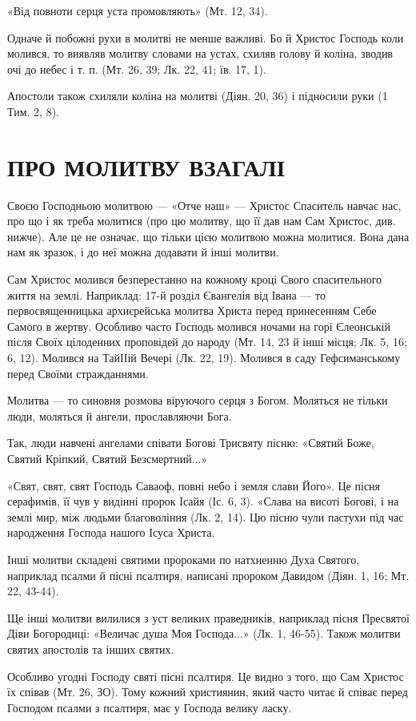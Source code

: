 \documentclass[main.tex]{subfiles}
\begin{document}
«Від повноти серця уста промовляють» (Мт. 12, 34).

Одначе й побожні рухи в молитві не менше важливі. Бо й Христос Господь коли молився, то виявляв молитву словами на устах, схиляв голову й коліна, зводив очі до небес і т. п. (Мт. 26, 39; Лк. 22, 41; їв. 17, 1).

Апостоли також схиляли коліна на молитві (Діян. 20, 36) і підносили руки (1 Тим. 2, 8).

\section{ПРО МОЛИТВУ ВЗАГАЛІ}

Своєю Господньою молитвою — «Отче наш» — Христос Спаситель навчає нас, про що і як треба молитися (про цю молитву, що її дав нам Сам Христос, див. нижче). Але це не означає, що тільки цією молитвою можна молитися. Вона дана нам як зразок, і до неї можна додавати й інші молитви.

Сам Христос молився безперестанно на кожному кроці Свого спасительного життя на землі. Наприклад: 17-й розділ Євангелія від Івана — то первосвященницька архиєрейська молитва Христа перед принесенням Себе Самого в жертву. Особливо часто Господь молився ночами на горі Єлеонській після Своїх цілоденних проповідей до народу (Мт. 14, 23 й інші місця; Лк. 5, 16; 6, 12). Молився на ТайІІій Вечері (Лк. 22, 19). Молився в саду Гефсиманському перед Своїми стражданнями.

Молитва — то синовня розмова віруючого серця з Богом. Моляться не тільки люди, моляться й ангели, прославляючи Бога.

Так, люди навчені ангелами співати Богові Трисвяту пісню: «Святий Боже, Святий Кріпкий, Святий Безсмертний...»

«Свят, свят, свят Господь Саваоф, повні небо і земля слави Його». Це пісня серафимів, її чув у видінні пророк Ісайя (Іс. 6, 3). «Слава на висоті Богові, і на землі мир, між людьми благовоління (Лк. 2, 14). Цю пісню чули пастухи під час народження Господа нашого Ісуса Христа.

Інші молитви складені святими пророками по натхненню Духа Святого, наприклад псалми й пісні псалтиря, написані пророком Давидом (Діян. 1, 16; Мт. 22, 43-44).

Ще інші молитви вилилися з уст великих праведників, наприклад пісня Пресвятої Діви Богородиці: «Величає душа Моя Господа...» (Лк. 1, 46-55). Також молитви святих апостолів та інших святих.

Особливо угодні Господу святі пісні псалтиря. Це видно з того, що Сам Христос їх співав (Мт. 26, ЗО). Тому кожний християнин, який часто читає й співає перед Господом псалми з псалтиря, має у Господа велику ласку.
\end{document}

